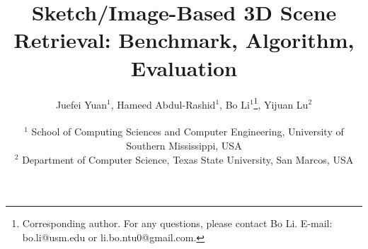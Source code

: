 \documentclass[times, 10pt,twocolumn]{article}
\begin{document}
\title{Sketch/Image-Based 3D Scene Retrieval: Benchmark, Algorithm, Evaluation}

\author
       {
			  \begin{minipage}[b]{0.95\linewidth} %
        \centering
             Juefei Yuan$^{1}$, \hspace{1pt}	
						 Hameed Abdul-Rashid$^{1}$, \hspace{1pt}
							Bo Li$^{1}$\thanks{Corresponding author. For any questions, please contact Bo Li. E-mail: bo.li@usm.edu or li.bo.ntu0@gmail.com.}, \hspace{1pt}
							Yijuan Lu$^{2}$
       \end{minipage}
        \\
                 $^{1}$ School of Computing Sciences and Computer Engineering, University of Southern Mississippi, USA\\
                 $^{2}$ Department of Computer Science, Texas State University, San Marcos, USA\\								
				}


\maketitle
\thispagestyle{empty}
\end{document}
